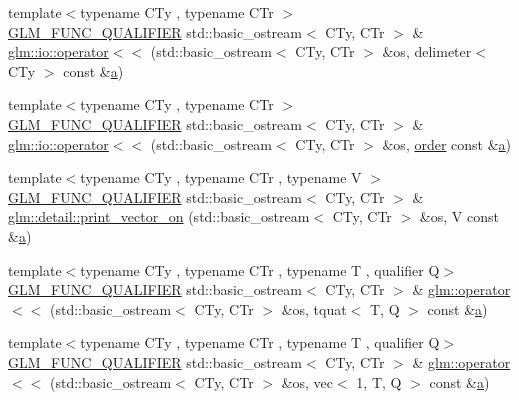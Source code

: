 \begin{DoxyCompactItemize}
\item 
{\footnotesize template$<$typename C\+Ty , typename C\+Tr $>$ }\\\mbox{\hyperlink{setup_8hpp_a33fdea6f91c5f834105f7415e2a64407}{G\+L\+M\+\_\+\+F\+U\+N\+C\+\_\+\+Q\+U\+A\+L\+I\+F\+I\+ER}} std\+::basic\+\_\+ostream$<$ C\+Ty, C\+Tr $>$ \& \mbox{\hyperlink{namespaceglm_1_1io_a7c5774d5b7b03ff810042e141d893082}{glm\+::io\+::operator$<$$<$}} (std\+::basic\+\_\+ostream$<$ C\+Ty, C\+Tr $>$ \&os, delimeter$<$ C\+Ty $>$ const \&\mbox{\hyperlink{_s_d_l__opengl__glext_8h_a3309789fc188587d666cda5ece79cf82}{a}})
\item 
{\footnotesize template$<$typename C\+Ty , typename C\+Tr $>$ }\\\mbox{\hyperlink{setup_8hpp_a33fdea6f91c5f834105f7415e2a64407}{G\+L\+M\+\_\+\+F\+U\+N\+C\+\_\+\+Q\+U\+A\+L\+I\+F\+I\+ER}} std\+::basic\+\_\+ostream$<$ C\+Ty, C\+Tr $>$ \& \mbox{\hyperlink{namespaceglm_1_1io_a4dab7c825ecbd918643ed9fc9ef4ecb6}{glm\+::io\+::operator$<$$<$}} (std\+::basic\+\_\+ostream$<$ C\+Ty, C\+Tr $>$ \&os, \mbox{\hyperlink{_s_d_l__opengl__glext_8h_ac64a59f91026a137ab3ce387f6c7e4a7}{order}} const \&\mbox{\hyperlink{_s_d_l__opengl__glext_8h_a3309789fc188587d666cda5ece79cf82}{a}})
\item 
{\footnotesize template$<$typename C\+Ty , typename C\+Tr , typename V $>$ }\\\mbox{\hyperlink{setup_8hpp_a33fdea6f91c5f834105f7415e2a64407}{G\+L\+M\+\_\+\+F\+U\+N\+C\+\_\+\+Q\+U\+A\+L\+I\+F\+I\+ER}} std\+::basic\+\_\+ostream$<$ C\+Ty, C\+Tr $>$ \& \mbox{\hyperlink{namespaceglm_1_1detail_a9d760c8d2e4e01ac441fcbba7d387055}{glm\+::detail\+::print\+\_\+vector\+\_\+on}} (std\+::basic\+\_\+ostream$<$ C\+Ty, C\+Tr $>$ \&os, V const \&\mbox{\hyperlink{_s_d_l__opengl__glext_8h_a3309789fc188587d666cda5ece79cf82}{a}})
\item 
{\footnotesize template$<$typename C\+Ty , typename C\+Tr , typename T , qualifier Q$>$ }\\\mbox{\hyperlink{setup_8hpp_a33fdea6f91c5f834105f7415e2a64407}{G\+L\+M\+\_\+\+F\+U\+N\+C\+\_\+\+Q\+U\+A\+L\+I\+F\+I\+ER}} std\+::basic\+\_\+ostream$<$ C\+Ty, C\+Tr $>$ \& \mbox{\hyperlink{group__gtx__io_ga0d49970be1b7cdc10a2b027cea97c7e3}{glm\+::operator$<$$<$}} (std\+::basic\+\_\+ostream$<$ C\+Ty, C\+Tr $>$ \&os, tquat$<$ T, Q $>$ const \&\mbox{\hyperlink{_s_d_l__opengl__glext_8h_a3309789fc188587d666cda5ece79cf82}{a}})
\item 
{\footnotesize template$<$typename C\+Ty , typename C\+Tr , typename T , qualifier Q$>$ }\\\mbox{\hyperlink{setup_8hpp_a33fdea6f91c5f834105f7415e2a64407}{G\+L\+M\+\_\+\+F\+U\+N\+C\+\_\+\+Q\+U\+A\+L\+I\+F\+I\+ER}} std\+::basic\+\_\+ostream$<$ C\+Ty, C\+Tr $>$ \& \mbox{\hyperlink{group__gtx__io_ga7a029530f08d465cd95b60186c625aba}{glm\+::operator$<$$<$}} (std\+::basic\+\_\+ostream$<$ C\+Ty, C\+Tr $>$ \&os, vec$<$ 1, T, Q $>$ const \&\mbox{\hyperlink{_s_d_l__opengl__glext_8h_a3309789fc188587d666cda5ece79cf82}{a}})

\end{DoxyCompactItemize}
